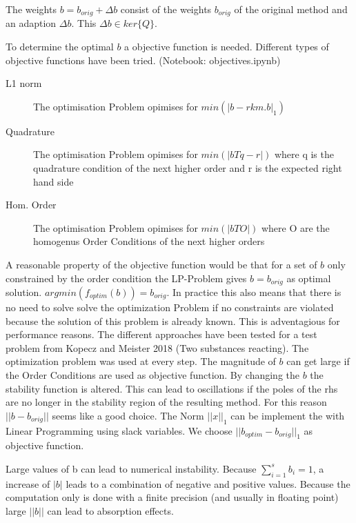 \documentclass{article}
\begin{document}
The weights $b = b_{orig} + \Delta b$ consist of the weights $b_{orig}$ of the original method and an adaption $\Delta b$. This $\Delta b \in ker \{ Q \}$. 

To determine the optimal $b$ a objective function is needed.
Different types of objective functions have been tried. (Notebook: objectives.ipynb)

\begin{description}

\item[L1 norm] The optimisation Problem opimises for $min(|b-rkm.b|_1)$
            
\item[Quadrature]   The optimisation Problem opimises for $min(|bTq-r|)$
                            where q is the quadrature condition of the next higher order 
                            and r is the expected right hand side
            
\item[Hom. Order]    The optimisation Problem opimises for $min(|bTO|)$ where O are the homogenus Order Conditions of the next higher orders
                            
 
\end{description}

A reasonable property of the objective function would be that for a set of $b$ only constrained by the order condition the LP-Problem gives $b = b_{orig}$ as optimal solution.  $argmin(f_{optim}(b)) = b_{orig}$. In practice this also means that there is no need to solve solve the optimization Problem if no constraints are violated because the solution of this problem is already known. This is adventagious for performance reasons.
The different approaches have been tested for a test problem from Kopecz and Meister 2018 (Two substances reacting). The optimization problem was used at every step.
The magnitude of $b$ can get large if the Order Conditions are used as objective function.
By changing the $b$ the stability function is altered. This can lead to oscillations if the poles of the rhs are no longer in the stability region of the resulting method.
For this reason $||b-b_{orig}||$ seems like a good choice. The Norm $||x||_1$ can be implement the with Linear Programming using slack variables. We choose $||b_{optim}-b_{orig}||_1$ as objective function.

Large values of b can lead to numerical instability. Because $\sum_{i  = 1}^s b_i = 1$, a increase of $|b|$ leads to a combination of negative and positive values. Because the computation only is done with a finite precision (and usually in floating point) large $||b||$ can lead to absorption effects.    
\end{document}
